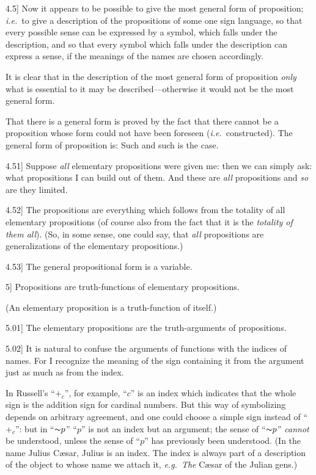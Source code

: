 \documentclass[12pt,oneside]{book}[2007/10/19]
\newcommand{\PropositionE}[2]{%
  \item[\phantomsection\label{PropE:#1}\PropGRef{#1}] #2%
}
\newcommand{\PropGRef}[1]{\hyperref[PropG:#1]{#1}}
\newcommand{\DPtypo}[2]{#2}
\newcommand{\Not}[1]{\mathord{\thicksim} #1}
\newcommand{\idEst}{\textit{i.e.}}
\newcommand{\exempliGratia}{\textit{e.g.}}
\begin{document}
\begin{propositions}
\PropositionE{4.5}
{Now it appears to be possible to give the
most general form of proposition; \idEst\ to give a
description of the propositions of some one sign
language, so that every possible sense can be
expressed by a symbol, which falls under the
description, and so that every symbol which falls
under the description can express a sense, if
the meanings of the names are chosen accordingly.

It is clear that in the description of the most
general form of proposition \emph{only} what is essential
to it may be described---otherwise it would not be
the most general form.

That there is a general form is proved by the
fact that there cannot be a proposition whose
form could not have been foreseen (\idEst\ constructed).
The general form of proposition is: Such and
such is the case.}


\PropositionE{4.51}
{Suppose \emph{all} elementary propositions were given
me: then we can simply ask: what propositions I
can build out of them. And these are \emph{all} propositions
and \emph{so} are they limited.}


\PropositionE{4.52}
{The propositions are everything which follows
from the totality of all elementary propositions (of
course also from the fact that it is the \emph{totality of
them all}). (So, in some sense, one could say, that
\emph{all} propositions are generalizations of the elementary
propositions.)}


\PropositionE{4.53}
{The general propositional form is a variable.}


\PropositionE{5}
{Propositions are truth-functions of elementary
propositions.

(An elementary proposition is a truth-function
of itself.)}


\PropositionE{5.01}
{The elementary propositions are the truth-arguments
of propositions.}


\PropositionE{5.02}
{It is natural to confuse the arguments of
functions with the indices of names. For I
recognize the meaning of the sign containing it
from the argument just as much as from the
index.

In Russell's ``$\DPtypo{+}{+_{c}}$'', for example, ``$c$'' is an
index which indicates that the whole sign is the
addition sign for cardinal numbers. But this way
of symbolizing depends on arbitrary agreement,
and one could choose a simple sign instead of
``$+_{c}$'': but in ``$\Not{p}$'' ``$p$'' is not an index but
an argument; the sense of ``$\Not{p}$'' \emph{cannot} be understood,
unless the sense of ``$p$'' has previously been
understood. (In the name Julius Cæsar, Julius is
an index. The index is always part of a description
of the object to whose name we attach it, \exempliGratia\ \emph{The}
Cæsar of the Julian gens.)

}
\end{propositions}
\end{document}
